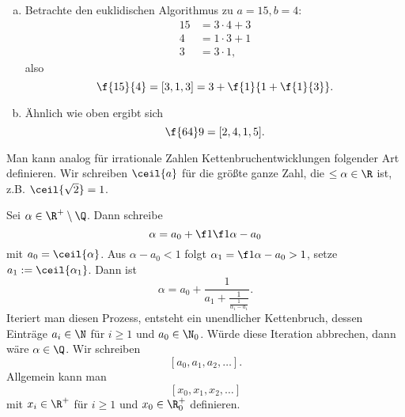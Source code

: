 \begin{ex} \label{6.2}
	\begin{enumerate}[a)]
		\item
			Betrachte den euklidischen Algorithmus zu $a = 15, b = 4$:
			\begin{align*}
				15 &= 3 \cdot 4 + 3 \\
				4 &= 1 \cdot 3 + 1 \\
				3 &= 3 \cdot 1,
			\end{align*}
			also
			\[
				\f {15}{4} = [3, 1, 3] = 3 + \f {1}{1 + \f{1}{3}}.
			\]
		\item
			Ähnlich wie oben ergibt sich
			\[
				\f {64}9 = [2, 4, 1, 5].
			\]
	\end{enumerate}
\end{ex}

\begin{nt} \label{6.3}
	Man kann analog für irrationale Zahlen Kettenbruchentwicklungen folgender Art definieren.
	Wir schreiben $\ceil{a}$ für die größte ganze Zahl, die $\le \alpha \in \R$ ist, z.B. $\ceil{\sqrt 2} = 1$.

	Sei $\alpha \in \R^+ \setminus \Q$.
	Dann schreibe
	\[
		\alpha = a_0 + \f 1{\f 1{\alpha - a_0}}
	\]
	mit $a_0 = \ceil{\alpha}$.
	Aus $\alpha - a_0 < 1$ folgt $\alpha_1 = \f 1{\alpha - a_0} > 1$, setze $a_1 := \ceil{\alpha_1}$.
	Dann ist
	\[
		\alpha = a_0 + \dfrac 1{a_1 + \frac 1{\frac 1{\alpha_1 - a_1}}}.
	\]
	Iteriert man diesen Prozess, entsteht ein unendlicher Kettenbruch, dessen Einträge $a_i \in \N$ für $i \ge 1$ und $a_0 \in \N_0$.
	Würde diese Iteration abbrechen, dann wäre $\alpha \in \Q$.
	Wir schreiben
	\[
		[a_0, a_1, a_2, \dotsc].
	\]
	Allgemein kann man
	\[
		[x_0, x_1, x_2, \dotsc]
	\]
	mit $x_i \in \R^+$ für $i \ge 1$ und $x_0 \in \R_0^+$ definieren.
\end{nt}

